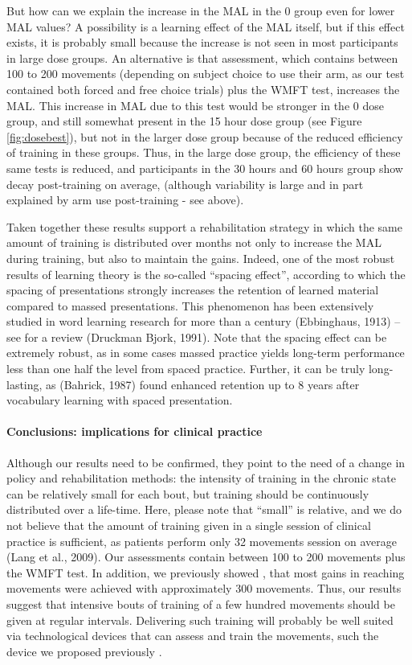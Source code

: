 But how can we explain the increase in the MAL in the 0 group even for lower MAL values? A possibility is a learning effect of the MAL itself, but if this effect exists, it is probably small because the increase is not seen in most participants in large dose groups. 
An alternative is that assessment, which contains between 100 to 200 movements (depending on subject choice to use their arm, as our test contained both forced and free choice trials) plus the WMFT test, increases the MAL. 
This increase in MAL due to this test would be stronger in the 0 dose group, and still somewhat present in the 15 hour dose group (see Figure \ref{fig:dosebest}), but not in the larger dose group because of the reduced efficiency of training in these groups. 
Thus, in the large dose group, the efficiency of these same tests is reduced, and participants in the 30 hours and 60 hours group show decay post-training on average, (although variability is large and in part explained by arm use post-training - see above). 

Taken together these results support a rehabilitation strategy in which the same amount of training is distributed over months not only to increase the MAL during training, but also to maintain the gains. 
Indeed, one of the most robust results of learning theory is the so-called “spacing effect”, according to which the spacing of presentations strongly increases the retention of learned material compared to massed presentations. 
This phenomenon has been extensively studied in word learning research for more than a century (Ebbinghaus, 1913) – see for a review (Druckman  Bjork, 1991). 
Note that the spacing effect can be extremely robust, as in some cases massed practice yields long-term performance less than one half the level from spaced practice. 
Further, it can be truly long-lasting, as (Bahrick, 1987) found enhanced retention up to 8 years after vocabulary learning with spaced presentation. 

\paragraph{Conclusions: implications for clinical practice}
Although our results need to be confirmed, they point to the need of a change in policy and rehabilitation methods: the intensity of training in the chronic state can be relatively small for each bout, but training should be continuously distributed over a life-time. 
Here, please note that “small” is relative, and we do not believe that the amount of training  given in a single session of clinical practice is sufficient, as patients perform only 32 movements session on average (Lang et al., 2009). 
Our assessments contain between 100 to 200 movements plus the WMFT test. 
In addition, we previously showed \cite{Park2017}, that most gains in reaching movements were achieved with approximately 300 movements. 
Thus, our results suggest that intensive bouts of training of a few hundred movements should be given at regular intervals. 
Delivering such training will probably be well suited via technological devices that can assess and train the movements, such the device we proposed previously \cite{Park2016}. 


